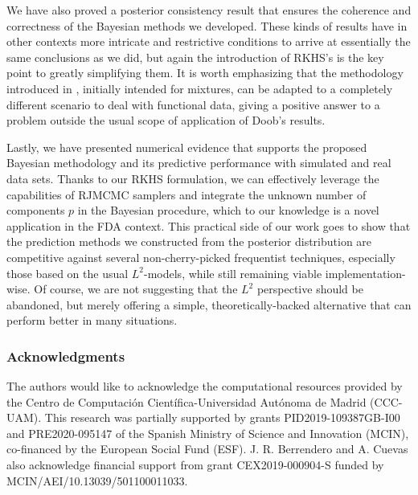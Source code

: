 \documentclass{article}
\numberwithin{equation}{section}
\theoremstyle{plain}
\theoremstyle{definition}
\begin{document}
We have also proved a posterior consistency result that ensures the coherence and correctness of the Bayesian methods we developed. These kinds of results have in other contexts more intricate and restrictive conditions to arrive at essentially the same conclusions as we did, but again the introduction of RKHS's is the key point to greatly simplifying them. It is worth emphasizing that the methodology introduced in \citet{miller2023consistency}, initially intended for mixtures, can be adapted to a completely different scenario to deal with functional data, giving a positive answer to a problem outside the usual scope of application of Doob's results.

Lastly, we have presented numerical evidence that supports the proposed Bayesian methodology and its predictive performance with simulated and real data sets. Thanks to our RKHS formulation, we can effectively leverage the capabilities of RJMCMC samplers and integrate the unknown number of components \(p\) in the Bayesian procedure, which to our knowledge is a novel application in the FDA context. This practical side of our work goes to show that the prediction methods we constructed from the posterior distribution are competitive against several non-cherry-picked frequentist techniques, especially those based on the usual \(L^2\)-models, while still remaining viable implementation-wise. Of course, we are not suggesting that the \(L^2\) perspective should be abandoned, but merely offering a simple, theoretically-backed alternative that can perform better in many situations.



{\footnotesize
\subsubsection*{Acknowledgments}
The authors would like to acknowledge the computational resources provided by the Centro de Computación Científica-Universidad Autónoma de Madrid (CCC-UAM). This research was partially supported by grants PID2019-109387GB-I00 and PRE2020-095147 of the Spanish Ministry of Science and Innovation (MCIN), co-financed by the European Social Fund (ESF). J. R. Berrendero and A. Cuevas also acknowledge financial support from grant CEX2019-000904-S funded by MCIN/AEI/10.13039/501100011033.
}







\newpage
\appendix

\end{document}
